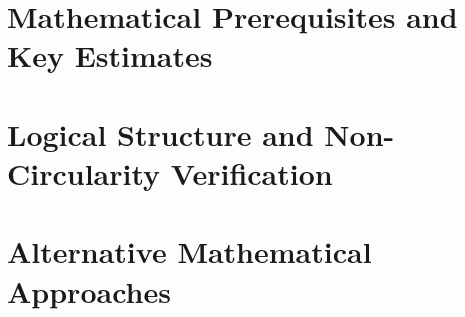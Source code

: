 \documentclass[11pt,a4paper]{report}
\begin{document}
\chapter{Mathematical Prerequisites and Key Estimates}
\label{ch:math-prerequisites}




\chapter{Logical Structure and Non-Circularity Verification}
\label{ch:verification}




\chapter{Alternative Mathematical Approaches}
\label{ch:alt-frameworks}












\end{document}
